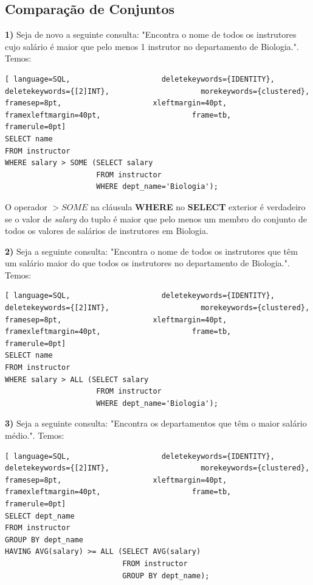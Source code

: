 \documentclass[oneside]{book}
\theoremstyle{definition}
\begin{document}
\subsection{Comparação de Conjuntos}
\textbf{1)} Seja de novo a seguinte consulta: "Encontra o nome de todos os instrutores cujo salário é maior que pelo menos 1 instrutor no departamento de Biologia.". Temos:
\begin{lstlisting}[ language=SQL,                     deletekeywords={IDENTITY},                     deletekeywords={[2]INT},                     morekeywords={clustered},                     framesep=8pt,                     xleftmargin=40pt,                     framexleftmargin=40pt,                     frame=tb,                     framerule=0pt]
SELECT name
FROM instructor 
WHERE salary > SOME (SELECT salary
                     FROM instructor
                     WHERE dept_name='Biologia');
\end{lstlisting}

O operador $> SOME$ na cláusula \textbf{WHERE} no \textbf{SELECT} exterior é verdadeiro se o valor de \textit{salary} do tuplo é maior que pelo menos um membro do conjunto de todos os valores de salários de instrutores em Biologia.

\textbf{2)} Seja a seguinte consulta: "Encontra o nome de todos os instrutores que têm um salário maior do que todos os instrutores no departamento de Biologia.". Temos:
\begin{lstlisting}[ language=SQL,                     deletekeywords={IDENTITY},                     deletekeywords={[2]INT},                     morekeywords={clustered},                     framesep=8pt,                     xleftmargin=40pt,                     framexleftmargin=40pt,                     frame=tb,                     framerule=0pt]
SELECT name
FROM instructor 
WHERE salary > ALL (SELECT salary
                     FROM instructor
                     WHERE dept_name='Biologia');
\end{lstlisting}

\textbf{3)} Seja a seguinte consulta: "Encontra os departamentos que têm o maior salário médio.". Temos:
\begin{lstlisting}[ language=SQL,                     deletekeywords={IDENTITY},                     deletekeywords={[2]INT},                     morekeywords={clustered},                     framesep=8pt,                     xleftmargin=40pt,                     framexleftmargin=40pt,                     frame=tb,                     framerule=0pt]
SELECT dept_name
FROM instructor 
GROUP BY dept_name
HAVING AVG(salary) >= ALL (SELECT AVG(salary)
                           FROM instructor
                           GROUP BY dept_name);
\end{lstlisting}
\end{document}
